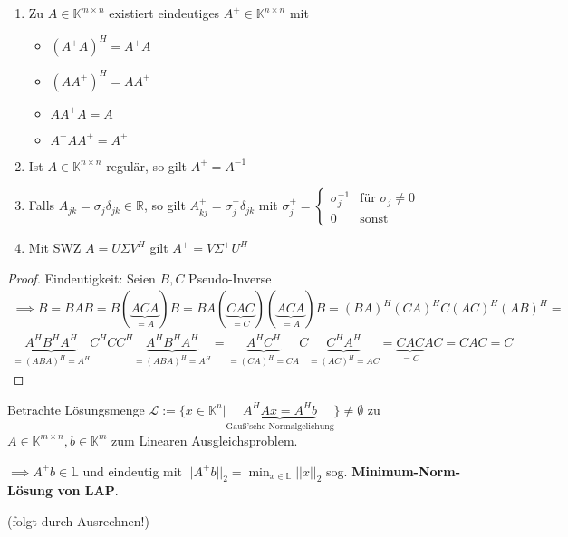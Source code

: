 \begin{corollary}
	\begin{enumerate}
		\item Zu $A \in \mathbb{K}^{m\times n}$ existiert eindeutiges $A^+ \in \mathbb{K}^{n\times n}$ mit
		\begin{itemize}
			\item $(A^+A)^H = A^+A$
			\item $(AA^+)^H = AA^+$
			\item $AA^+A=A$
			\item $A^+AA^+ = A^+$
		\end{itemize}
		\item Ist $A \in \mathbb{K}^{n\times n}$ regulär, so gilt $A^+ = A^{-1}$
		\item Falls $A_{jk} = \sigma_j \delta_{jk} \in \mathbb{R}$, so gilt $A_{kj}^+ = \sigma_j^+\delta_{jk}$ mit $\sigma_j^+ = \begin{cases}
			\sigma_j^{-1} & \text{für } \sigma_j \neq 0\\
			0 & \text{sonst}
		\end{cases}$
		\item Mit SWZ $A=U\Sigma V^H$ gilt $A^+ = V \Sigma^+ U^H$
	\end{enumerate}
\end{corollary}

\begin{proof}
	Eindeutigkeit: Seien $B,C$ Pseudo-Inverse
	\begin{align*}
		\implies B = BAB = B(\underbrace{ACA}_{=A})B = BA(\underbrace{CAC}_{=C})(\underbrace{ACA}_{=A})B =
		(BA)^H(CA)^HC(AC)^H(AB)^H =\\
		\underbrace{A^HB^HA^H}_{=(ABA)^H=A^H} C^H C C^H \underbrace{A^HB^HA^H}_{=(ABA)^H=A^H} =
		\underbrace{A^HC^H}_{=(CA)^H=CA} C \underbrace{C^HA^H}_{=(AC)^H=AC} =
		\underbrace{CAC}_{=C}AC = CAC = C
	\end{align*}
\end{proof}

\begin{remark}
	Betrachte Lösungsmenge $\mathcal{L} := \{x \in \mathbb{K}^n | \underbrace{A^HAx=A^Hb}_{\text{Gauß'sche Normalgelichung}}\} \neq \emptyset$ zu $A \in \mathbb{K}^{m\times n}, b \in \mathbb{K}^m$ zum Linearen Ausgleichsproblem.
	
	$\implies A^+b \in \mathbb{L}$ und eindeutig mit $||A^+b||_2 = \min_{x\in \mathbb{L}} ||x||_2$ sog. \textbf{Minimum-Norm-Lösung von LAP}.
	
	(folgt durch Ausrechnen!)
\end{remark}

